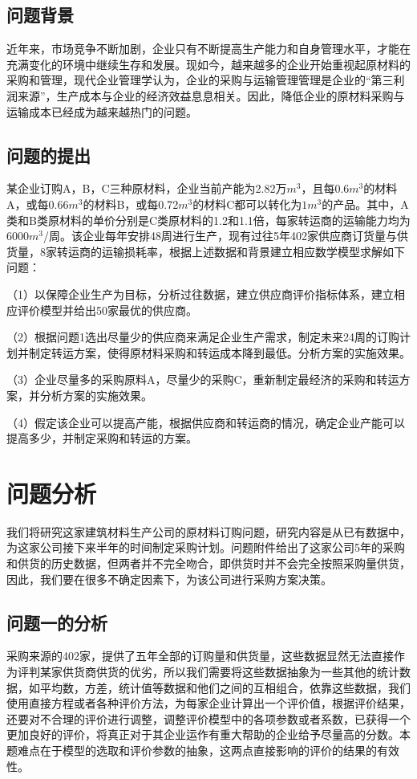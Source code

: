 \documentclass[withoutpreface,bwprint]{cumcmthesis} %
\begin{document}
\subsection{问题背景}
近年来，市场竞争不断加剧，企业只有不断提高生产能力和自身管理水平，才能在充满变化的环境中继续生存和发展。现如今，越来越多的企业开始重视起原材料的采购和管理，现代企业管理学认为，企业的采购与运输管理管理是企业的“第三利润来源”，生产成本与企业的经济效益息息相关\cite{bib:1}。因此，降低企业的原材料采购与运输成本已经成为越来越热门的问题。

\subsection{问题的提出}

某企业订购A，B，C三种原材料，企业当前产能为2.82万$m^3$，且每0.6$m^3$的材料A，或每0.66$m^3$的材料B，或每0.72$m^3$的材料C都可以转化为$1m^3$的产品。其中，A类和B类原材料的单价分别是C类原材料的1.2和1.1倍，每家转运商的运输能力均为6000$m^3$/周。该企业每年安排48周进行生产，现有过往5年402家供应商订货量与供货量，8家转运商的运输损耗率，根据上述数据和背景建立相应数学模型求解如下问题：

（1）以保障企业生产为目标，分析过往数据，建立供应商评价指标体系，建立相应评价模型并给出50家最优的供应商。

（2）根据问题1选出尽量少的供应商来满足企业生产需求，制定未来24周的订购计划并制定转运方案，使得原材料采购和转运成本降到最低。分析方案的实施效果。

（3）企业尽量多的采购原料A，尽量少的采购C，重新制定最经济的采购和转运方案，并分析方案的实施效果。

（4）假定该企业可以提高产能，根据供应商和转运商的情况，确定企业产能可以提高多少，并制定采购和转运的方案。

\section{问题分析}
我们将研究这家建筑材料生产公司的原材料订购问题，研究内容是从已有数据中，为这家公司接下来半年的时间制定采购计划。问题附件给出了这家公司5年的采购和供货的历史数据，但两者并不完全吻合，即供货时并不会完全按照采购量供货，因此，我们要在很多不确定因素下，为该公司进行采购方案决策。
\subsection{问题一的分析}
采购来源的402家，提供了五年全部的订购量和供货量，这些数据显然无法直接作为评判某家供货商供货的优劣，所以我们需要将这些数据抽象为一些其他的统计数据，如平均数，方差，统计值等数据和他们之间的互相组合，依靠这些数据，我们使用直接方程或者各种评价方法，为每家企业计算出一个评价值，根据评价结果，还要对不合理的评价进行调整，调整评价模型中的各项参数或者系数，已获得一个更加良好的评价，将真正对于其企业运作有重大帮助的企业给予尽量高的分数。本题难点在于模型的选取和评价参数的抽象，这两点直接影响的评价的结果的有效性。
\end{document}
